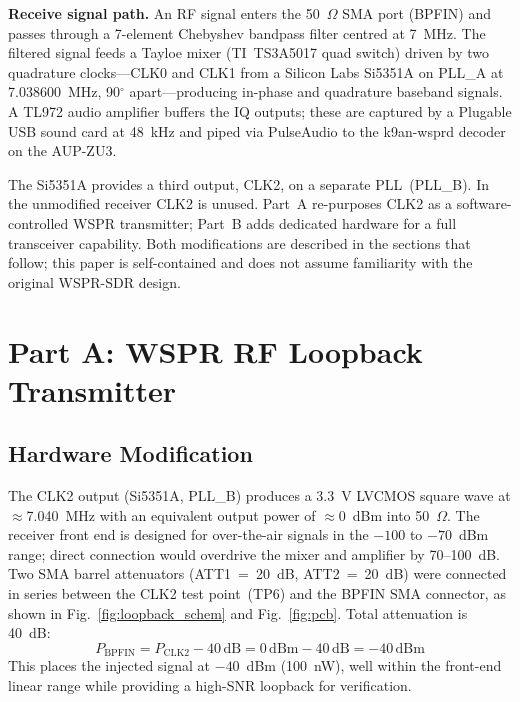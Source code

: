 \documentclass[conference]{IEEEtran}
\begin{document}
\textbf{Receive signal path.} An RF signal enters the 50~$\Omega$ SMA port (BPFIN)
and passes through a 7-element Chebyshev bandpass filter centred at 7~MHz. The
filtered signal feeds a Tayloe mixer (TI~TS3A5017 quad switch) driven by two
quadrature clocks---CLK0 and CLK1 from a Silicon Labs Si5351A on PLL\_A at
7.038600~MHz, 90$^\circ$ apart---producing in-phase and quadrature baseband
signals. A TL972 audio amplifier buffers the IQ outputs; these are captured by a
Plugable USB sound card at 48~kHz and piped via PulseAudio to the k9an-wsprd
decoder on the AUP-ZU3.

The Si5351A provides a third output, CLK2, on a separate PLL~(PLL\_B). In the
unmodified receiver CLK2 is unused. Part~A re-purposes CLK2 as a
software-controlled WSPR transmitter; Part~B adds dedicated hardware for a full
transceiver capability. Both modifications are described in the sections that
follow; this paper is self-contained and does not assume familiarity with the
original WSPR-SDR design.

\section{Part A: WSPR RF Loopback Transmitter}

\subsection{Hardware Modification}

The CLK2 output (Si5351A, PLL\_B) produces a 3.3~V LVCMOS square wave at
$\approx$7.040~MHz with an equivalent output power of $\approx$0~dBm into
50~$\Omega$. The receiver front end is designed for over-the-air signals in the
$-100$ to $-70$~dBm range; direct connection would overdrive the mixer and amplifier
by 70--100~dB. Two SMA barrel attenuators (ATT1~=~20~dB, ATT2~=~20~dB) were
connected in series between the CLK2 test point~(TP6) and the BPFIN SMA connector,
as shown in Fig.~\ref{fig:loopback_schem} and Fig.~\ref{fig:pcb}. Total
attenuation is 40~dB:
%
\begin{equation}
  P_\text{BPFIN} = P_\text{CLK2} - 40\,\text{dB}
                 = 0\,\text{dBm} - 40\,\text{dB} = -40\,\text{dBm}
  \label{eq:atten}
\end{equation}
%
This places the injected signal at $-40$~dBm (100~nW), well within the front-end
linear range while providing a high-SNR loopback for verification.
\end{document}
